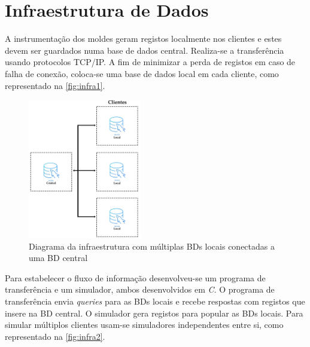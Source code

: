 \documentclass[11pt,twoside,a4paper]{report}
\begin{document}
\section{Infraestrutura de Dados}
A instrumentação dos moldes geram registos localmente nos clientes e estes devem ser guardados numa base de dados central. Realiza-se a transferência usando protocolos TCP/IP. A fim de minimizar a perda de registos em caso de falha de conexão, coloca-se uma base de dados local em cada cliente, como representado na \autoref{fig:infra1}.
\begin{figure}[H]
	\begin{center}
		\includegraphics[width=0.44\textwidth]{Esquema_Projeto_4} %
		\caption[Diagrama das bases de dados]{Diagrama da infraestrutura com múltiplas BDs locais conectadas a uma BD central}
		\label{fig:infra1}
		\end{center}
\end{figure}
Para estabelecer o fluxo de informação desenvolveu-se um programa de transferência e um simulador, ambos desenvolvidos em \textit{C}. O programa de transferência envia \textit{queries} para as BDs locais e recebe respostas com registos que insere na BD central. O simulador gera registos para popular as BDs locais. Para simular múltiplos clientes usam-se simuladores independentes entre si, como representado na \autoref{fig:infra2}.
\end{document}

